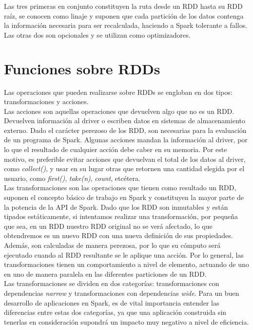 Las tres primeras en conjunto constituyen la ruta desde un RDD hasta su RDD raíz, se conocen como linaje y suponen que cada partición de los datos contenga la información necesaria para ser recalculada, haciendo a Spark tolerante a fallos. Las otras dos son opcionales y se utilizan como optimizadores.\\

\section{Funciones sobre RDDs}
 
Las operaciones que pueden realizarse sobre RDDs se engloban en dos tipos: transformaciones y acciones.\\
 
Las acciones son aquellas operaciones que devuelven algo que no es un RDD. Devuelven información al driver o escriben datos en sistemas de almacenamiento externo. Dado el carácter perezoso de los RDD, son necesarias para la evaluación de un programa de Spark. Algunas acciones mandan la información al driver, por lo que el resultado de cualquier acción debe caber en su memoria. Por este motivo, es preferible evitar acciones que devuelvan el total de los datos al driver, como \textit{collect()}, y usar en su lugar otras que retornen una cantidad elegida por el usuario, como \textit{first()}, \textit{take(n)}, \textit{count}, etcétera.\\
 
Las transformaciones son las operaciones que tienen como resultado un RDD, suponen el concepto básico de trabajo en Spark y constituyen la mayor parte de la potencia de la API de Spark. Dado que  los RDD  son inmutables y están tipados estáticamente, si intentamos realizar una transformación, por pequeña que sea, en un RDD nuestro RDD original no se verá afectado, lo que obtendremos es un nuevo RDD con una nueva definición de sus propiedades. Además, son calculadas de manera perezosa, por lo que su cómputo será ejecutado cuando al RDD resultante se le aplique una acción. Por lo general, las transformaciones tienen un comportamiento a nivel de elemento, actuando de uno en uno de manera paralela en las diferentes particiones de un RDD.\\
 
Las transformaciones se dividen en dos categorías: transformaciones con dependencias \textit{narrow} y transformaciones con dependencias \textit{wide}. Para un buen desarrollo de aplicaciones en Spark, es de vital importancia entender las diferencias entre estas dos categorías, ya que una aplicación construida sin tenerlas en consideración supondrá un impacto muy negativo a nivel de eficiencia.\\
 
